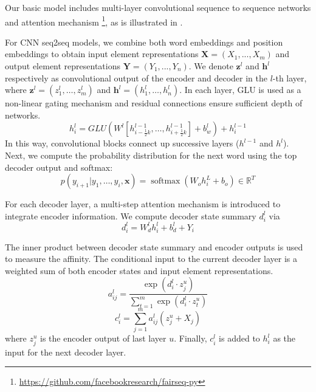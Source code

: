 Our basic model includes multi-layer convolutional sequence to sequence networks \cite{gehring2017convs2s} and attention mechanism \footnote{\url{https://github.com/facebookresearch/fairseq-py}}, as is illustrated in . 

For CNN seq2seq models, we combine both word embeddings and position embeddings to obtain input element representations  $\mathbf{X} = (X_1,...,X_m)$ and output element representations $\mathbf{Y}=(Y_1,...,Y_n)$. We denote $\mathbf { z } ^ { l }$ and $\mathbf { h } ^ { l }$ respectively as convolutional output of the encoder and
decoder in the $l$-th layer, where $\mathbf { z } ^ { l } = \left( z _ { 1 } ^ { l } , \ldots , z _ { m } ^ { l } \right)$ and $\mathbf { h } ^ { l } = \left( h _ { 1 } ^ { l } , \ldots , h _ { n } ^ { l } \right)$. In each layer, GLU \cite{DauphinFAG17} is used as a non-linear gating mechanism and residual connections \cite{HeZRS16} ensure sufficient depth of networks.  
\begin{equation}
    h _ { i } ^ { l } = GLU \left( W ^ { l } \left[ h _ {i- \frac{1}{2}k } ^ { l - 1 } , \ldots , h _ { i+\frac{1}{2}k } ^ { l - 1 } \right] + b _ { w } ^ { l } \right) + h _ { i } ^ { l - 1 }
\end{equation}
In this way, convolutional blocks connect up successive layers ($h^{l-1}$ and $h^{l}$). Next, we compute the probability distribution for the next word using the top decoder output and softmax:
\begin{equation}
    p \left( y _ { i + 1 } | y _ { 1 } , \ldots , y _ { i } , \mathbf { x } \right) = \operatorname { softmax } \left( W _ { o } h _ { i } ^ { L } + b _ { o } \right) \in \mathbb { R } ^ { T }
\end{equation}

For each decoder layer, a multi-step attention mechanism is introduced to integrate encoder information. We compute decoder state summary $d_{i}^{l}$ via
\begin{equation}
    d _ { i } ^ { l } = W _ { d } ^ { l } h _ { i } ^ { l } + b _ { d } ^ { l } + Y _ { i }
\end{equation}

The inner product between decoder state summary and encoder outputs is used 
to measure the affinity. The conditional input to the current 
decoder layer is a weighted sum of both encoder states and input element representations.
\begin{equation}\label{eq:a}
    a _ { i j } ^ { l } = \frac { \exp \left( d _ { i } ^ { l } \cdot z _ { j } ^ { u } \right) } { \sum _ { t = 1 } ^ { m } \exp \left( d _ { i } ^ { l } \cdot z _ { t } ^ { u } \right) }
\end{equation}
\begin{equation}\label{eq:c}
    c _ { i } ^ { l } = \sum _ { j = 1 } ^ { m } a _ { i j } ^ { l } \left( z _ { j } ^ { u } + X_j \right)
\end{equation}
where $z_{j}^{u}$ is the encoder output of last layer $u$.  
Finally, $c _ { i } ^ { l }$ is added to $h_{i}^{l}$ as the input for the next decoder layer.

